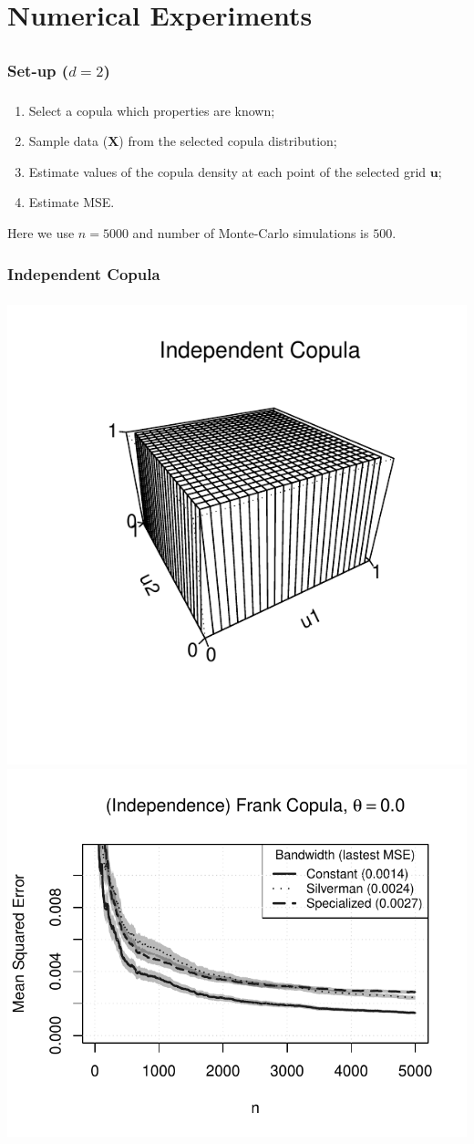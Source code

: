 \documentclass[aspectratio=169]{beamer}
\begin{document}
\section{Numerical Experiments}
	\subsection{}
		\subsubsection{Set-up ($ d=2 $)}
			\begin{frame}
				\frametitle{\insertsubsubsection}
				
				\begin{enumerate}
					\item Select a copula which properties are known;
					\item Sample data ($ \mathbf{X} $) from the selected copula distribution;
					\item Estimate values of the copula density at each point of the selected grid $ \mathbf{u} $;
					\item Estimate MSE.\\[1em]
				\end{enumerate}
				
				Here we use $ n=5000 $ and number of Monte-Carlo simulations is $ 500 $.
			
			\end{frame}
			
		\subsubsection{Independent Copula}
			\begin{frame}
				\frametitle{\insertsubsubsection}
				
				\begin{flushleft}
					\includegraphics[width=0.4\linewidth]{plots/numerical_results/frank0}
					\includegraphics[width=0.5\linewidth]{../text/plots/experiment_results/frank0}
				\end{flushleft}

			\end{frame}
			
\end{document}
